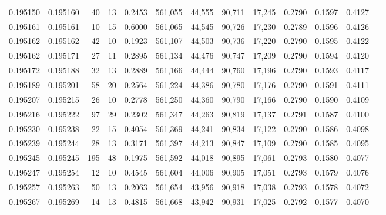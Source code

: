 \begin{tabular}{rrrrrrrrrrrrr}
0.195150 & 0.195160 &    40 &  13 &                                     0.2453 & 561,055 &  44,555 &  90,711 &  17,245 & 0.2790 & 0.1597 & 0.4127 \\
0.195161 & 0.195161 &    10 &  15 &                                     0.6000 & 561,065 &  44,545 &  90,726 &  17,230 & 0.2789 & 0.1596 & 0.4126 \\
0.195162 & 0.195162 &    42 &  10 &                                     0.1923 & 561,107 &  44,503 &  90,736 &  17,220 & 0.2790 & 0.1595 & 0.4122 \\
0.195162 & 0.195171 &    27 &  11 &                                     0.2895 & 561,134 &  44,476 &  90,747 &  17,209 & 0.2790 & 0.1594 & 0.4120 \\
0.195172 & 0.195188 &    32 &  13 &                                     0.2889 & 561,166 &  44,444 &  90,760 &  17,196 & 0.2790 & 0.1593 & 0.4117 \\
0.195189 & 0.195201 &    58 &  20 &                                     0.2564 & 561,224 &  44,386 &  90,780 &  17,176 & 0.2790 & 0.1591 & 0.4111 \\
0.195207 & 0.195215 &    26 &  10 &                                     0.2778 & 561,250 &  44,360 &  90,790 &  17,166 & 0.2790 & 0.1590 & 0.4109 \\
0.195216 & 0.195222 &    97 &  29 &                                     0.2302 & 561,347 &  44,263 &  90,819 &  17,137 & 0.2791 & 0.1587 & 0.4100 \\
0.195230 & 0.195238 &    22 &  15 &                                     0.4054 & 561,369 &  44,241 &  90,834 &  17,122 & 0.2790 & 0.1586 & 0.4098 \\
0.195239 & 0.195244 &    28 &  13 &                                     0.3171 & 561,397 &  44,213 &  90,847 &  17,109 & 0.2790 & 0.1585 & 0.4095 \\
0.195245 & 0.195245 &   195 &  48 &                                     0.1975 & 561,592 &  44,018 &  90,895 &  17,061 & 0.2793 & 0.1580 & 0.4077 \\
0.195247 & 0.195254 &    12 &  10 &                                     0.4545 & 561,604 &  44,006 &  90,905 &  17,051 & 0.2793 & 0.1579 & 0.4076 \\
0.195257 & 0.195263 &    50 &  13 &                                     0.2063 & 561,654 &  43,956 &  90,918 &  17,038 & 0.2793 & 0.1578 & 0.4072 \\
0.195267 & 0.195269 &    14 &  13 &                                     0.4815 & 561,668 &  43,942 &  90,931 &  17,025 & 0.2792 & 0.1577 & 0.4070 \\

\end{tabular}
